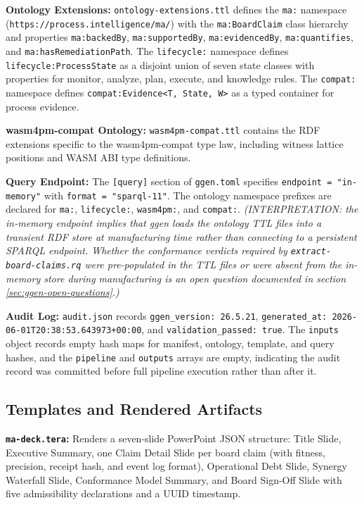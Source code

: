 \textbf{Ontology Extensions:} \texttt{ontology-extensions.ttl} defines the \texttt{ma:}
namespace (\texttt{https://process.intelligence/ma/}) with the \texttt{ma:BoardClaim} class
hierarchy and properties \texttt{ma:backedBy}, \texttt{ma:supportedBy}, \texttt{ma:evidencedBy},
\texttt{ma:quantifies}, and \texttt{ma:hasRemediationPath}. The \texttt{lifecycle:} namespace
defines \texttt{lifecycle:ProcessState} as a disjoint union of seven state classes with properties
for monitor, analyze, plan, execute, and knowledge rules. The \texttt{compat:} namespace defines
\texttt{compat:Evidence<T, State, W>} as a typed container for process evidence.

\textbf{wasm4pm-compat Ontology:} \texttt{wasm4pm-compat.ttl} contains the RDF extensions
specific to the wasm4pm-compat type law, including witness lattice positions and WASM ABI
type definitions.

\textbf{Query Endpoint:} The \texttt{[query]} section of \texttt{ggen.toml} specifies
\texttt{endpoint = "in-memory"} with \texttt{format = "sparql-11"}. The ontology namespace
prefixes are declared for \texttt{ma:}, \texttt{lifecycle:}, \texttt{wasm4pm:}, and
\texttt{compat:}. \textit{(INTERPRETATION: the in-memory endpoint implies that ggen loads the
ontology TTL files into a transient RDF store at manufacturing time rather than connecting to a
persistent SPARQL endpoint. Whether the conformance verdicts required by
\texttt{extract-board-claims.rq} were pre-populated in the TTL files or were absent from the
in-memory store during manufacturing is an open question documented in section
\ref{sec:ggen-open-questions}.)}

\textbf{Audit Log:} \texttt{audit.json} records \texttt{ggen\_version: 26.5.21},
\texttt{generated\_at: 2026-06-01T20:38:53.643973+00:00}, and \texttt{validation\_passed: true}.
The \texttt{inputs} object records empty hash maps for manifest, ontology, template, and query
hashes, and the \texttt{pipeline} and \texttt{outputs} arrays are empty, indicating the audit
record was committed before full pipeline execution rather than after it.

\subsection{Templates and Rendered Artifacts}
\label{sec:ggen-implementation-templates}

\textbf{\texttt{ma-deck.tera}:} Renders a seven-slide PowerPoint JSON structure: Title Slide,
Executive Summary, one Claim Detail Slide per board claim (with fitness, precision, receipt hash,
and event log format), Operational Debt Slide, Synergy Waterfall Slide, Conformance Model
Summary, and Board Sign-Off Slide with five admissibility declarations and a UUID timestamp.


